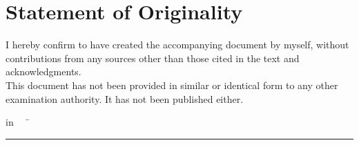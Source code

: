 
\chapter*{Statement of Originality}
I hereby confirm to have created the accompanying document by myself, without contributions from any sources other than those cited in the text and acknowledgments. \\
This document has not been provided in similar or identical form to any other examination authority.
It has not been published either.
\begin{tabbing}
	\cfgDatum\xspace in \cfgCity ~~	\= \rule{8cm}{0.3mm}\\
	\> \cfgAuthor
\end{tabbing}
